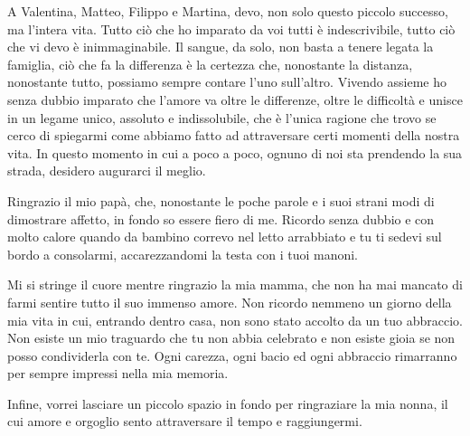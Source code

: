 \documentclass[12pt,a4paper,openright,twoside]{book}
\begin{document}
\begin{acknowledgements}
A Valentina, Matteo, Filippo e Martina, devo, non solo questo piccolo successo, ma l'intera vita.
Tutto ciò che ho imparato da voi tutti è indescrivibile, tutto ciò che vi devo è inimmaginabile.
Il sangue, da solo, non basta a tenere legata la famiglia, ciò che fa la differenza è la certezza che, nonostante la distanza, nonostante tutto, possiamo sempre contare l'uno sull'altro.
Vivendo assieme ho senza dubbio imparato che l'amore va oltre le differenze, oltre le difficoltà e unisce in un legame unico, assoluto e indissolubile, che è l'unica ragione che trovo se cerco di spiegarmi come abbiamo fatto ad attraversare certi momenti della nostra vita.
In questo momento in cui a poco a poco, ognuno di noi sta prendendo la sua strada, desidero augurarci il meglio.

Ringrazio il mio papà, che, nonostante le poche parole e i suoi strani modi di dimostrare affetto, in fondo so essere fiero di me.
Ricordo senza dubbio e con molto calore quando da bambino correvo nel letto arrabbiato e tu ti sedevi sul bordo a consolarmi, accarezzandomi la testa con i tuoi manoni.

Mi si stringe il cuore mentre ringrazio la mia mamma, che non ha mai mancato di farmi sentire tutto il suo immenso amore.
Non ricordo nemmeno un giorno della mia vita in cui, entrando dentro casa, non sono stato accolto da un tuo abbraccio.
Non esiste un mio traguardo che tu non abbia celebrato e non esiste gioia se non posso condividerla con te.
Ogni carezza, ogni bacio ed ogni abbraccio rimarranno per sempre impressi nella mia memoria.

Infine, vorrei lasciare un piccolo spazio in fondo per ringraziare la mia nonna, il cui amore e orgoglio sento attraversare il tempo e raggiungermi.



\end{acknowledgements}
\end{document}
